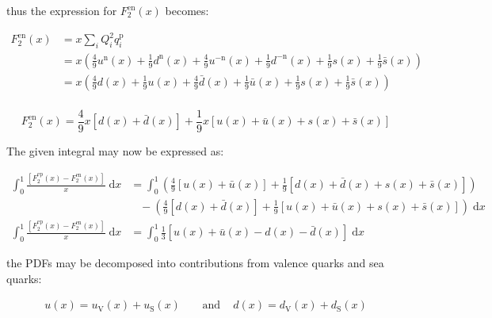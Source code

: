 \documentclass[11pt]{article}
\theoremstyle{definition}
\begin{document}
thus the expression for $F_{2}^{\text{en}}(x)$ becomes:

\begin{align}
    F_{2}^{\text{en}}(x) &= x \sum_{i} Q_i^2q_i^{\text{p}}\\
    &= x\left( \frac{4}{9} u^{\text{n}}(x) + \frac{1}{9}d^{\text{n}}(x) + \frac{4}{9} u^{-\text{n}}(x) + \frac{1}{9} d^{-\text{n}}(x) + \frac{1}{9} s(x)+ \frac{1}{9} \bar{s}(x)   \right)\\
    &= x\left( \frac{4}{9} d(x) + \frac{1}{9}u(x) + \frac{4}{9} \bar{d}(x) + \frac{1}{9} \bar{u}(x)+ \frac{1}{9} s(x)+ \frac{1}{9} \bar{s}(x)   \right)\\
\end{align}

\begin{equation}\label{part b initial}
    \boxed{
        F_{2}^{\text{en}}(x) = 
        \frac{4}{9}x
        \left[
            d(x) + \bar{d}(x)
        \right]
        +
        \frac{1}{9}x
        \left[
            u(x) + \bar{u}(x) + s(x) + \bar{s}(x)
        \right]
    }
\end{equation}

The given integral may now be expressed as:

\begin{align}
    \int_0^1 \frac{\left[F_{2}^{\text{ep}}(x) - F_{2}^{\text{en}}(x)\right]}{x}\; \text{d}x
    &=
    \int_0^1 
    \left(
        \frac{4}{9}
        \left[
            u(x) + \bar{u}(x)
        \right]
        +
        \frac{1}{9}
        \left[
            d(x) + \bar{d}(x) + s(x) + \bar{s}(x)
        \right]
    \right)\\
    &\;\;\; -
    \left(
        \frac{4}{9}
        \left[
            d(x) + \bar{d}(x)
        \right]
        +
        \frac{1}{9}
        \left[
            u(x) + \bar{u}(x) + s(x) + \bar{s}(x)
        \right]
    \right)
    \; \text{d}x\\
    \int_0^1 \frac{\left[F_{2}^{\text{ep}}(x) - F_{2}^{\text{en}}(x)\right]}{x}\; \text{d}x
    &=
    \int_0^1
    \frac{1}{3}[u(x) + \bar{u}(x) - d(x) - \bar{d}(x)]\; \text{d}x
\end{align}


the PDFs may be decomposed into contributions from valence quarks and sea quarks:

\begin{align}
    u(x) = u_{\text{V}}(x) + u_{\text{S}}(x) \;\;\; &\text{ and }\;\;\; d(x) = d_{\text{V}}(x) + d_{\text{S}}(x)\\
\end{align}
\end{document}

